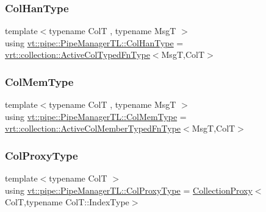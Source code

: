 \mbox{\label{structvt_1_1pipe_1_1_pipe_manager_t_l_a0bf4e2e805b3ce2be9f499e0e39aadfa}} 
\subsubsection{\texorpdfstring{Col\+Han\+Type}{ColHanType}}
{\footnotesize\ttfamily template$<$typename ColT , typename MsgT $>$ \\
using \hyperlink{structvt_1_1pipe_1_1_pipe_manager_t_l_a0bf4e2e805b3ce2be9f499e0e39aadfa}{vt\+::pipe\+::\+Pipe\+Manager\+T\+L\+::\+Col\+Han\+Type} =  \hyperlink{namespacevt_1_1vrt_1_1collection_a939327f58a5838cf9d7dcc7f14d1670c}{vrt\+::collection\+::\+Active\+Col\+Typed\+Fn\+Type}$<$MsgT,ColT$>$}

\mbox{\label{structvt_1_1pipe_1_1_pipe_manager_t_l_abf7ad21be4f3d0db51d643aa8ea959cc}} 
\subsubsection{\texorpdfstring{Col\+Mem\+Type}{ColMemType}}
{\footnotesize\ttfamily template$<$typename ColT , typename MsgT $>$ \\
using \hyperlink{structvt_1_1pipe_1_1_pipe_manager_t_l_abf7ad21be4f3d0db51d643aa8ea959cc}{vt\+::pipe\+::\+Pipe\+Manager\+T\+L\+::\+Col\+Mem\+Type} =  \hyperlink{namespacevt_1_1vrt_1_1collection_a87925616c03cf4ccc548d33b2fe172ee}{vrt\+::collection\+::\+Active\+Col\+Member\+Typed\+Fn\+Type}$<$MsgT,ColT$>$}

\mbox{\label{structvt_1_1pipe_1_1_pipe_manager_t_l_af56c58cad882496e35f01227d4da3898}} 
\subsubsection{\texorpdfstring{Col\+Proxy\+Type}{ColProxyType}}
{\footnotesize\ttfamily template$<$typename ColT $>$ \\
using \hyperlink{structvt_1_1pipe_1_1_pipe_manager_t_l_af56c58cad882496e35f01227d4da3898}{vt\+::pipe\+::\+Pipe\+Manager\+T\+L\+::\+Col\+Proxy\+Type} =  \hyperlink{namespacevt_a0d58a693bfb96e0ce5d145692a1a1f98}{Collection\+Proxy}$<$ColT,typename Col\+T\+::\+Index\+Type$>$}

